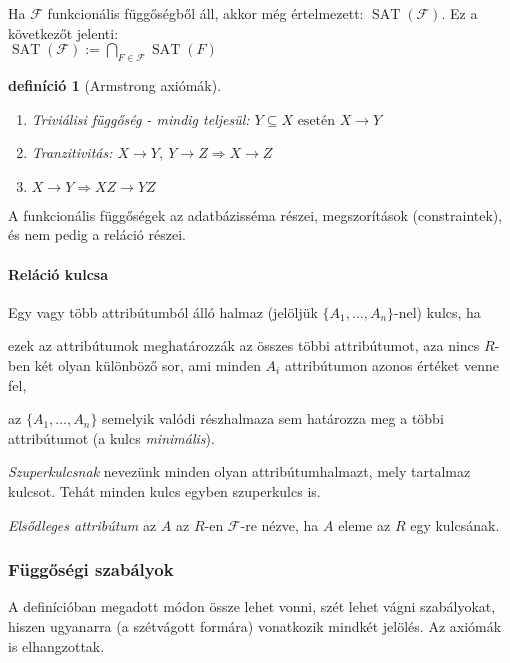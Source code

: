 \documentclass[fleqn,10pt,a4paper]{article}
\newcommand{\nn}{\Rightarrow}
\newcommand{\di}{\displaystyle}
\newcommand{\F}{\mathcal{F}}
\newenvironment{enumAr}{\renewcommand{\labelenumi}{\emph{{\small (\emph{AR\theenumi})}}}\begin{enumerate}}{\end{enumerate}}
\theoremstyle{magyar}
\newtheorem{de}{definíció}[section]
\DeclareMathOperator{\sat}{SAT}
\begin{document}
  \noindent Ha $\mathcal F$ funkcionális függőségből áll, akkor még értelmezett: $\sat(\mathcal F)$. Ez a következőt
  jelenti:\\
  $\sat(\mathcal F) := \di\bigcap\limits_{F\in\mathcal F}\sat(F)$\\

  \begin{de}[Armstrong axiómák]\ \\
    \begin{enumAr}
    \item Triviálisi függőség - mindig teljesül: $Y \subseteq X \text{ esetén } X\to Y$
    \item Tranzitivitás: $X \to Y,\  Y\to Z \nn X \to Z$
    \item $X\to Y \nn XZ \to YZ$
    \end{enumAr}
  \end{de}
  
  
  A funkcionális függőségek az adatbázisséma részei, megszorítások (constraintek), és nem pedig a reláció részei.
  
  \paragraph{Reláció kulcsa} Egy vagy több attribútumból álló halmaz (jelöljük $\{A_1,\ldots,A_n\}$-nel) kulcs, ha
  \begin{inparaenum}[\itshape a)]
  \item ezek az attribútumok meghatározzák az összes többi attribútumot, aza nincs $R$-ben két olyan különböző sor,
    ami minden $A_i$ attribútumon azonos értéket venne fel,
  \item az  $\{A_1,\ldots,A_n\}$ semelyik valódi részhalmaza sem határozza meg a többi attribútumot (a kulcs
    \emph{minimális}).
  \end{inparaenum}

  \emph{Szuperkulcsnak} nevezünk minden olyan attribútumhalmazt, mely tartalmaz kulcsot. Tehát minden kulcs egyben
  szuperkulcs is.
  
  \emph{Elsődleges attribútum} az $A$ az $R$-en $\F$-re nézve, ha $A$ eleme az $R$ egy kulcsának.
  
  \subsubsection{Függőségi szabályok}
  A definícióban megadott módon össze lehet vonni, szét lehet vágni szabályokat, hiszen ugyanarra (a szétvágott formára)
  vonatkozik mindkét jelölés. Az axiómák is elhangzottak.
  
\end{document}
